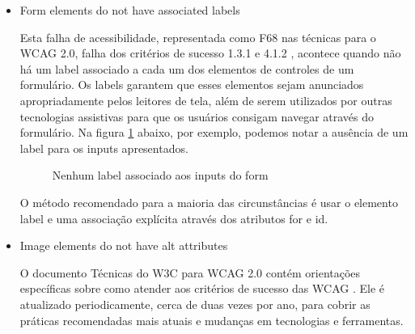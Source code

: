 \documentclass[
	12pt,				%
	openright,			%
	oneside,			%
	a4paper,			%
	chapter=TITLE,		%
	section=TITLE,		%
	subsection=TITLE,	%
	subsubsection=TITLE,%
	english,			%
	brazil				%
	]{abntex2}
\theoremstyle{definition}
\begin{document}
\begin{itemize}
 \item Form elements do not have associated labels
   
Esta falha de acessibilidade, representada como F68 nas técnicas para o WCAG 2.0, falha dos critérios de sucesso 1.3.1 e 4.1.2 \cite{cooper2010techniques}, acontece quando não há um label associado a cada um dos elementos de controles de um formulário. Os labels garantem que esses elementos sejam anunciados apropriadamente pelos leitores de tela, além de serem utilizados por outras tecnologias assistivas para que os usuários consigam navegar através do formulário. Na figura \ref{Nenhum label associado aos inputs do form} abaixo, por exemplo, podemos notar a ausência de um label para os inputs apresentados.

\begin{figure}[!h]
\centering
\caption{Nenhum label associado aos inputs do form}
\label{Nenhum label associado aos inputs do form}
\end{figure}

O método recomendado para a maioria das circunstâncias é usar o elemento label e uma associação explícita através dos atributos for e id.

 \item Image elements do not have alt attributes
   
O documento Técnicas do W3C para WCAG 2.0 contém orientações específicas sobre como atender aos critérios de sucesso das WCAG \cite{cooper2010techniques}. Ele é atualizado periodicamente, cerca de duas vezes por ano, para cobrir as práticas recomendadas mais atuais e mudanças em tecnologias e ferramentas.


\end{itemize}
\end{document}
